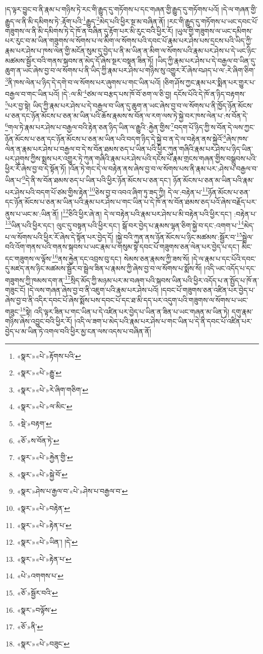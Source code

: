 །ད་ལྟར་བྱུང་བ་ནི་རྣམ་པ་གཉིས་ཏེ་རང་གི་རྒྱུད་དུ་གཏོགས་པ་དང་གཞན་གྱི་རྒྱུད་དུ་གཏོགས་པའོ། །དེ་ལ་གཞན་གྱི་རྒྱུད་ལ་ནི་མི་དམིགས་ཏེ་:རྟོག་པའི་\footnote{«སྣར་»«པེ་»རྟོགས་པའི་}རྒྱུད་\footnote{«སྣར་»«པེ་»རྒྱུ་}མེད་པའི་ཕྱིར་སྔ་མ་བཞིན་ནོ། །རང་གི་རྒྱུད་དུ་གཏོགས་པ་ཡང་དབང་པོ་གཟུགས་ལ་ནི་མི་དམིགས་ཏེ་དེ་ཁོ་ན་བཞིན་དུ་རྟོག་པར་མི་རུང་བའི་ཕྱིར་རོ། །ཡུལ་གྱི་གཟུགས་ལ་ཡང་དམིགས་པར་རུང་བ་མ་ཡིན་གཟུགས་ལ་སོགས་པ་ལ་མིག་ལ་སོགས་པའི་དབང་པོ་རྣམ་པར་ཤེས་པས་དྲངས་པའི་ཡིད་ཀྱི་རྣམ་པར་ཤེས་པ་ཁས་ལེན་གྱི་མངོན་སུམ་དུ་བྱེད་པ་ནི་མ་ཡིན་ན་མིག་ལ་སོགས་པའི་རྣམ་པར་ཤེས་པ་དེ་ཡང་ཉིང་མཚམས་སྦྱོར་བའི་གནས་སྐབས་ན་མེད་དོ་ཞེས་སྔར་བསྟན་ཟིན་ཏོ། །ཡིད་ཀྱི་རྣམ་པར་ཤེས་པ་དེ་བརྒྱལ་བ་ཡིན་དུ་ཆུག་ན་ཡང་ཞེས་བྱ་བ་ལ་སོགས་པ་ནི་ཡིད་ཀྱི་རྣམ་པར་ཤེས་པ་གཉིས་སུ་འགྱུར་རོ་ཞེས་བཤད་པ་ལ་:རེ་ཞིག་ཅིག་\footnote{«སྣར་»«པེ་»རེ་ཞིག་གཅིག་}ནི་ཁས་ལེན་པ་ཉིད་དེ་དགེ་བ་ལ་སོགས་པར་ཞུགས་པ་གང་ཡིན་པའོ། །ཅིག་ཤོས་ཀྱང་རྣམ་པར་སྨིན་པར་གྱུར་པ་བརྒྱལ་བ་གང་ཡིན་པའོ། །དེ་:ལ་མི་\footnote{«སྣར་»«པེ་»ལ་མིང་}ཙམ་ལ་བརྩད་པས་ཁོ་བོ་ཅག་ལ་ཅི་བྱ། དངོས་པོའི་དེ་ཁོ་ན་ཉིད་བརྟགས་\footnote{«སྡེ་»བརྟག་}པར་བྱ་སྟེ། ཡིད་ཀྱི་རྣམ་པར་ཤེས་པ་དེ་བརྒྱལ་བ་ཡིན་དུ་ཆུག་ན་ཡང་ཞེས་བྱ་བ་ལ་སོགས་པ་ནི་ཁྱོད་ཉོན་མོངས་པ་ཅན་དང་ཉོན་མོངས་པ་ཅན་མ་ཡིན་པའི་ཆོས་རྣམས་ས་བོན་ལ་རག་ལས་ཏེ་སྐྱེ་བར་ཁས་ལེན་པ་:ས་བོན་དེ་\footnote{«ཅོ་»ས་བོན་ཏེ་}གལ་ཏེ་རྣམ་པར་ཤེས་པ་བརྒྱལ་བའི་རྟེན་ཅན་ཉིད་ཡིན་ལ་རྒྱུའི་:རྐྱེན་གྱིས་\footnote{«སྣར་»«པེ་»རྐྱེན་གྱི་}བདག་པོ་ཉིད་ཀྱི་ས་བོན་དེ་ལས་ཀྱང་ཉོན་མོངས་པ་ཅན་དང་ཉོན་མོངས་པ་ཅན་མ་ཡིན་པའི་བདག་ཉིད་དེ་སྐྱེ་བ་ན་དེ་ལ་བརྟེན་ནས་སྐྱེའོ་\footnote{«སྣར་»«པེ་»སྐྱེ་བོ་}ཞེས་ཁས་ལེན་ན་རྣམ་པར་ཤེས་པ་བརྒྱལ་བ་དེ་ས་བོན་ཐམས་ཅད་པ་ཡིན་པའི་ཕྱིར་ཀུན་གཞིའི་རྣམ་པར་ཤེས་པ་ཉིད་ཡིན་པར་ཤུགས་ཀྱིས་སྨྲས་པར་འགྱུར་ཏེ་ཀུན་གཞིའི་རྣམ་པར་ཤེས་པའི་དངོས་པོ་རྣམ་གྲངས་གཞན་གྱིས་བསྒྲུབས་པའི་ཕྱིར་རོ་ཞེས་བྱ་བ་དེ་སྟོན་ཏོ། །འོན་ཏེ་གང་དེ་ལ་བརྟེན་ནས་ཞེས་བྱ་བ་ལ་སོགས་པས་ནི་རྣམ་པར་:ཤེས་པ་བརྒྱལ་བ་ཡིན་པ་\footnote{«སྣར་»ཤེས་པ་རྒྱལ་བ་«པེ་»ཤེས་པ་བརྒྱལ་བ་}དེ་ནི་ས་བོན་ཐམས་ཅད་པ་ཡིན་པའི་ཕྱིར་ཉོན་མོངས་པ་ཅན་དང་། ཉོན་མོངས་པ་ཅན་མ་ཡིན་པའི་རྣམ་པར་ཤེས་པའི་བདག་པོ་ཙམ་གྱིས་རྟེན་\footnote{«སྣར་»«པེ་»བརྟེན་}ཅེས་བྱ་བ་འབའ་ཞིག་ཏུ་ཟད་ཀྱི། དེ་ལ་:བརྟེན་པ་\footnote{«སྣར་»«པེ་»རྟེན་པ་}ཉོན་མོངས་པ་ཅན་དང་ཉོན་མོངས་པ་ཅན་མ་ཡིན་པའི་རྣམ་པར་ཤེས་པ་གང་ཡིན་པ་དེ་ཁོ་ན་ས་བོན་ཐམས་ཅད་པའོ་ཞེས་བརྗོད་པར་ནུས་པ་ཡང་མ་:ཡིན་ནོ། །\footnote{«སྣར་»«པེ་»ཡིན་། །དེ་}ཅིའི་ཕྱིར་ཞེ་ན། དེ་ལ་བརྟེན་པའི་རྣམ་པར་ཤེས་པ་མི་བརྟེན་པའི་ཕྱིར་དང་། :བརྟེན་པ་\footnote{«སྣར་»«པེ་»རྟེན་པ་}ཡིན་པའི་ཕྱིར་དང་། ལུང་དུ་བསྟན་པའི་ཕྱིར་དང་། སྒོ་བར་བྱེད་པ་རྣམས་ལྷན་ཅིག་སྐྱེ་བ་དང་:འགག་པ་\footnote{«པེ་»འགགས་པ་}མེད་པ་ལ་སོགས་པའི་ཕྱིར་རོ་ཞེས་དེ་སྟོན་པར་བྱེད་དོ། །སྐྱེ་བའི་ཀུན་ནས་ཉོན་མོངས་པ་ཉིང་མཚམས་:སྦྱོར་བ་\footnote{«ཅོ་»སྦྱོར་བའི་}སྦྲེལ་བའི་འོག་གནས་པའི་གནས་སྐབས་པ་ཡང་རྣམ་པ་གསུམ་སྟེ་དབང་པོ་གཟུགས་ཅན་ལེན་པར་བྱེད་པ་དང་། མིང་དང་གཟུགས་ལ་ལྟོས་\footnote{«སྣར་»བལྟོས་}ནས་རྐྱེན་དང་འབྲས་བུ་དང་། སེམས་ཅན་རྣམས་ཀྱི་ཟས་སོ། །དེ་ལ་རྣམ་པ་དང་པོའི་དབང་དུ་མཛད་ནས་ཉིང་མཚམས་སྦྱོར་བ་སྦྲེལ་ཟིན་པ་རྣམས་ཀྱི་ཞེས་བྱ་བ་ལ་སོགས་པ་སྨོས་སོ། །འདི་ཡང་འདོད་པ་དང་གཟུགས་ཀྱི་ཁམས་དག་ན་\footnote{«ཅོ་»ནི་}སྲིད་མོད་ཀྱི་མཉམ་པར་མ་བཞག་པའི་སྐབས་ཡིན་པའི་ཕྱིར་འདོད་པ་ན་སྤྱོད་པ་ཁོ་ན་གཟུང་ངོ། །དེ་ལས་གཞན་ཞེས་བྱ་བ་ནི་འཇུག་པའི་རྣམ་པར་ཤེས་པའོ། །དབང་པོ་གཟུགས་ཅན་འཛིན་པར་བྱེད་པ་ཞེས་བྱ་བ་ནི་འདིར་དབང་པོ་ཞེས་སྨོས་པས་དབང་པོ་དང་ཐ་མི་དད་པར་འདུག་པའི་གཟུགས་ལ་སོགས་པ་ཡང་གཟུང་\footnote{«སྣར་»«པེ་»བཟུང་}སྟེ། འདི་ལྟར་ཟིན་པ་གང་ཡིན་པ་དེ་འཛིན་པར་བྱེད་པ་ཡིན་ན་ཟིན་པ་ཡང་གཞན་མ་ཡིན་ཏེ། དགུ་རྣམ་གཉིས་ཞེས་འབྱུང་བའི་ཕྱིར་རོ། །འདི་ལ་ཟག་པ་མེད་པའི་རྣམ་པར་ཤེས་པ་གང་ཡིན་པ་དེ་ནི་དབང་པོ་འཛིན་པར་བྱེད་པ་མ་ཡིན་ཏེ་འགལ་བའི་ཕྱིར་མྱ་ངན་ལས་འདས་པ་བཞིན་ནོ། 